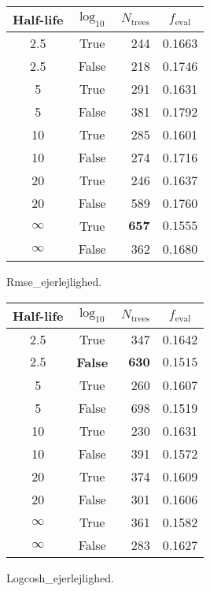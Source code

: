 \begin{margintable}
  \begin{tabular}{@{}ccrc@{}}
    Half-life & $\log_{10}$ & $N_\mathrm{trees}$ & $f_\mathrm{eval}$ \\
    \midrule
    \num{2.5} & True & \num{244} & \num{0.1663} \\
    \num{2.5} & False & \num{218} & \num{0.1746} \\
    \num{5} & True & \num{291} & \num{0.1631} \\
    \num{5} & False & \num{381} & \num{0.1792} \\
    \num{10} & True & \num{285} & \num{0.1601} \\
    \num{10} & False & \num{274} & \num{0.1716} \\
    \num{20} & True & \num{246} & \num{0.1637} \\
    \num{20} & False & \num{589} & \num{0.1760} \\
    $\bm{\infty}$ & True & $\mathbf{657}$ & $\mathbf{0.1555}$ \\
    $\infty$ & False & \num{362} & \num{0.1680} \\
  \end{tabular}
  \caption{\label{tab:h:HPO_initial_Rmse_ejerlejlighed}Rmse_ejerlejlighed.}
\end{margintable}

\begin{margintable}
  \begin{tabular}{@{}ccrc@{}}
    Half-life & $\log_{10}$ & $N_\mathrm{trees}$ & $f_\mathrm{eval}$ \\
    \midrule
    \num{2.5} & True & \num{347} & \num{0.1642} \\
    $\mathbf{2.5}$ & \textbf{False} & $\mathbf{630}$ & $\mathbf{0.1515}$ \\
    \num{5} & True & \num{260} & \num{0.1607} \\
    \num{5} & False & \num{698} & \num{0.1519} \\
    \num{10} & True & \num{230} & \num{0.1631} \\
    \num{10} & False & \num{391} & \num{0.1572} \\
    \num{20} & True & \num{374} & \num{0.1609} \\
    \num{20} & False & \num{301} & \num{0.1606} \\
    $\infty$ & True & \num{361} & \num{0.1582} \\
    $\infty$ & False & \num{283} & \num{0.1627} \\
  \end{tabular}
  \caption{\label{tab:h:HPO_initial_Logcosh_ejerlejlighed}Logcosh_ejerlejlighed.}
\end{margintable}


